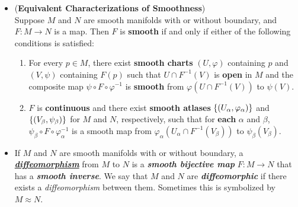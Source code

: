 \documentclass[11pt]{article}
\begin{document}
\begin{itemize}
\item 
\begin{proposition} (\textbf{Equivalent Characterizations of Smoothness}) \citep{lee2003introduction}\\
Suppose $M$ and $N$ are smooth manifolds with or without boundary, and $F: M \rightarrow N$ is a map. Then $F$ is \textbf{smooth} if and only if either of the following conditions is satisfied:
\begin{enumerate}
\item For every $p \in M$, there exist \textbf{smooth charts} $(U, \varphi)$ containing $p$ and $(V, \psi)$ containing $F(p)$ such that $U \cap F^{-1}(V)$ is \textbf{open} in $M$ and the composite map $\psi \circ F \circ \varphi^{-1}$ is \textbf{smooth} from $\varphi(U\cap F^{-1}(V))$ to $\psi(V)$.
\item $F$ is \textbf{continuous} and there exist \textbf{smooth atlases} $\left\{(U_{\alpha}, \varphi_{\alpha})\right\}$ and $\left\{(V_{\beta}, \psi_{\beta})\right\}$ for $M$ and $N$, respectively, such that for \textbf{each} $\alpha$ and $\beta$, $\psi_{\beta} \circ F \circ \varphi_{\alpha}^{-1}$ is a smooth map from $\varphi_{\alpha}(U_{\alpha}\cap F^{-1}(V_{\beta}))$ to $\psi_{\beta}(V_{\beta})$.
\end{enumerate}
\end{proposition}

\item \begin{definition}
If $M$ and $N$ are smooth manifolds with or without boundary, a \underline{\emph{\textbf{diffeomorphism}}} from $M$ to $N$ is a \emph{\textbf{smooth bijective map}} $F: M \rightarrow N$ that has a \emph{\textbf{smooth inverse}}. We say that $M$ and $N$ are \emph{\textbf{diffeomorphic}} if there exists a \emph{diffeomorphism} between them. Sometimes this is symbolized by $M \approx N$.
\end{definition}
\end{itemize}
\end{document}
